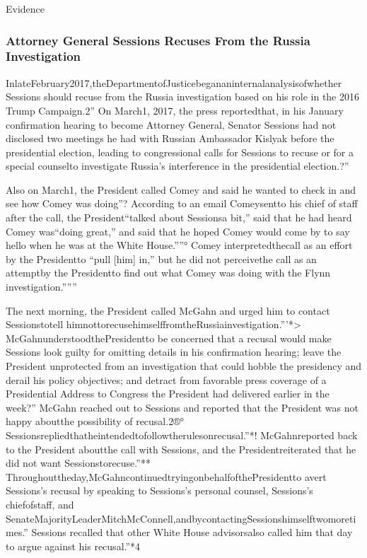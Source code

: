 Evidence

\subsubsection{Attorney General Sessions Recuses From the Russia Investigation}

InlateFebruary2017,theDepartmentofJusticebegananinternalanalysisofwhether Sessions should recuse from the Russia investigation based on his role in the 2016 Trump Campaign.2” On March1, 2017, the press reportedthat, in his January confirmation hearing to become Attorney General, Senator Sessions had not disclosed two meetings he had with Russian Ambassador Kislyak before the presidential election, leading to congressional calls for Sessions to recuse or for a special counselto investigate Russia’s interference in the presidential election.?”

Also on March1, the President called Comey and said he wanted to check in and see how Comey was doing”? According to an email Comeysentto his chief of staff after the call, the President“talked about Sessionsa bit,” said that he had heard Comey was“doing great,” and said that he hoped Comey would come by to say hello when he was at the White House.””° Comey interpretedthecall as an effort by the Presidentto “pull [him] in,” but he did not perceivethe call as an attemptby the Presidentto find out what Comey was doing with the Flynn investigation.”””

The next morning, the President called McGahn and urged him to contact Sessionstotell himnottorecusehimselffromtheRussiainvestigation.”’*> McGahnunderstoodthePresidentto be concerned that a recusal would make Sessions look guilty for omitting details in his confirmation hearing; leave the President unprotected from an investigation that could hobble the presidency and derail his policy objectives; and detract from favorable press coverage of a Presidential Address to Congress the President had delivered earlier in the week?” McGahn reached out to Sessions and reported that the President was not happy aboutthe possibility of recusal.2®° Sessionsrepliedthatheintendedtofollowtherulesonrecusal.”*! McGahnreported back to the President aboutthe call with Sessions, and the Presidentreiterated that he did not want Sessionstorecuse.”** Throughouttheday,McGahncontinuedtryingonbehalfofthePresidentto avert Sessions’s recusal by speaking to Sessions’s personal counsel, Sessions’s chiefofstaff, and SenateMajorityLeaderMitchMcConnell,andbycontactingSessionshimselftwomoretimes.” Sessions recalled that other White House advisorsalso called him that day to argue against his recusal.”*4

